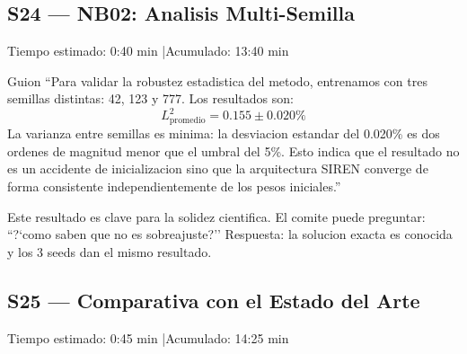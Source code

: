 \subsection{S24 --- NB02: Analisis Multi-Semilla}

\begin{timebox}
Tiempo estimado: 0:40 min \quad|\quad Acumulado: 13:40 min
\end{timebox}
\vspace{4pt}

\begin{slidebox}{Guion}
``Para validar la robustez estadistica del metodo, entrenamos con tres semillas
distintas: 42, 123 y 777. Los resultados son:
\[
  L^2_\text{promedio} = 0.155 \pm 0.020\%
\]
La varianza entre semillas es minima: la desviacion estandar del 0.020\% es dos
ordenes de magnitud menor que el umbral del 5\%. Esto indica que el resultado no
es un accidente de inicializacion sino que la arquitectura SIREN converge de forma
consistente independientemente de los pesos iniciales.''
\end{slidebox}
\vspace{4pt}

\begin{tipbox}
Este resultado es clave para la solidez cientifica. El comite puede preguntar:
``?`como saben que no es sobreajuste?'' Respuesta: la solucion exacta es conocida
y los 3 seeds dan el mismo resultado.
\end{tipbox}

\vspace{8pt}

\subsection{S25 --- Comparativa con el Estado del Arte}

\begin{timebox}
Tiempo estimado: 0:45 min \quad|\quad Acumulado: 14:25 min
\end{timebox}
\vspace{4pt}

